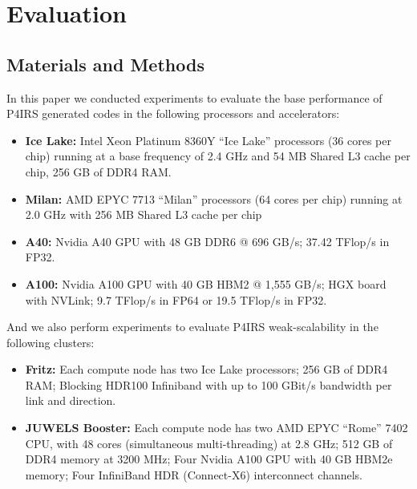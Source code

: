 \documentclass[Afour,sageh,times]{sagej}
\begin{document}
\section{Evaluation}
\label{sec:evaluation}


\subsection{Materials and Methods}

In this paper we conducted experiments to evaluate the base performance of P4IRS generated codes in the following processors and accelerators:

\begin{itemize}
  \item \textbf{Ice Lake:} Intel Xeon Platinum 8360Y “Ice Lake” processors (36 cores per chip) running at a base frequency of 2.4 GHz and 54 MB Shared L3 cache per chip, 256 GB of DDR4 RAM.
  \item \textbf{Milan:} AMD EPYC 7713 “Milan” processors (64 cores per chip) running at 2.0 GHz with 256 MB Shared L3 cache per chip
  \item \textbf{A40:} Nvidia A40 GPU with 48 GB DDR6 @ 696 GB/s; 37.42 TFlop/s in FP32.
  \item \textbf{A100:} Nvidia A100 GPU with 40 GB HBM2 @ 1,555 GB/s; HGX board with NVLink; 9.7 TFlop/s in FP64 or 19.5 TFlop/s in FP32.
\end{itemize}

And we also perform experiments to evaluate P4IRS weak-scalability in the following clusters:

\begin{itemize}
  \item \textbf{Fritz:} Each compute node has two Ice Lake processors; 256 GB of DDR4 RAM; Blocking HDR100 Infiniband with up to 100 GBit/s bandwidth per link and direction.
  \item \textbf{JUWELS Booster:} Each compute node has two AMD EPYC ``Rome'' 7402 CPU, with 48 cores (simultaneous multi-threading) at 2.8 GHz; 512 GB of DDR4 memory at 3200 MHz; Four Nvidia A100 GPU with 40 GB HBM2e memory; Four InfiniBand HDR (Connect-X6) interconnect channels.
\end{itemize}
\end{document}
